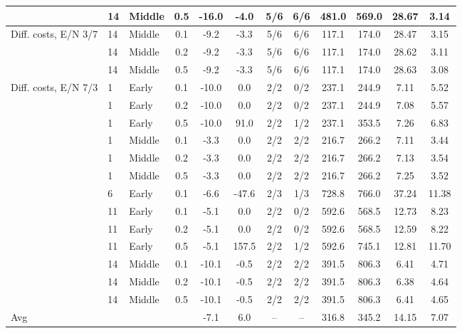 \begin{table}[p]
{\begin{tabular}{lllc|cc|cc|cc|cc}
 & 14 & Middle & 0.5 & -16.0 & -4.0 & 5/6 & 6/6 & 481.0 & 569.0 & 28.67 & 3.14 \\
\midrule
Diff. costs, E/N 3/7 & 14 & Middle & 0.1 & -9.2 & -3.3 & 5/6 & 6/6 & 117.1 & 174.0 & 28.47 & 3.15 \\
 & 14 & Middle & 0.2 & -9.2 & -3.3 & 5/6 & 6/6 & 117.1 & 174.0 & 28.62 & 3.11 \\
 & 14 & Middle & 0.5 & -9.2 & -3.3 & 5/6 & 6/6 & 117.1 & 174.0 & 28.63 & 3.08 \\
\midrule
Diff. costs, E/N 7/3 & 1 & Early & 0.1 & -10.0 & 0.0 & 2/2 & 0/2 & 237.1 & 244.9 & 7.11 & 5.52 \\
 & 1 & Early & 0.2 & -10.0 & 0.0 & 2/2 & 0/2 & 237.1 & 244.9 & 7.08 & 5.57 \\
 & 1 & Early & 0.5 & -10.0 & 91.0 & 2/2 & 1/2 & 237.1 & 353.5 & 7.26 & 6.83 \\
 & 1 & Middle & 0.1 & -3.3 & 0.0 & 2/2 & 2/2 & 216.7 & 266.2 & 7.11 & 3.44 \\
 & 1 & Middle & 0.2 & -3.3 & 0.0 & 2/2 & 2/2 & 216.7 & 266.2 & 7.13 & 3.54 \\
 & 1 & Middle & 0.5 & -3.3 & 0.0 & 2/2 & 2/2 & 216.7 & 266.2 & 7.25 & 3.52 \\
 & 6 & Early & 0.1 & -6.6 & -47.6 & 2/3 & 1/3 & 728.8 & 766.0 & 37.24 & 11.38 \\
 & 11 & Early & 0.1 & -5.1 & 0.0 & 2/2 & 0/2 & 592.6 & 568.5 & 12.73 & 8.23 \\
 & 11 & Early & 0.2 & -5.1 & 0.0 & 2/2 & 0/2 & 592.6 & 568.5 & 12.59 & 8.22 \\
 & 11 & Early & 0.5 & -5.1 & 157.5 & 2/2 & 1/2 & 592.6 & 745.1 & 12.81 & 11.70 \\
 & 14 & Middle & 0.1 & -10.1 & -0.5 & 2/2 & 2/2 & 391.5 & 806.3 & 6.41 & 4.71 \\
 & 14 & Middle & 0.2 & -10.1 & -0.5 & 2/2 & 2/2 & 391.5 & 806.3 & 6.38 & 4.64 \\
 & 14 & Middle & 0.5 & -10.1 & -0.5 & 2/2 & 2/2 & 391.5 & 806.3 & 6.41 & 4.65 \\
\midrule
Avg &  &  &  & -7.1 & 6.0 & -- & -- & 316.8 & 345.2 & 14.15 & 7.07 \\
\bottomrule
\end{tabular}%
}
\end{table}
